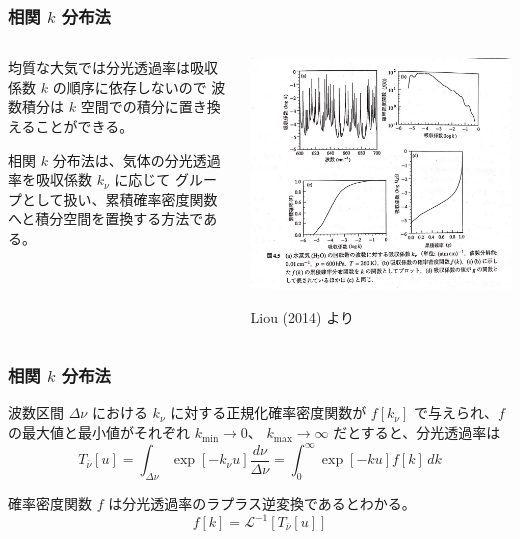 \documentclass[unicode,colorlinks]{beamer}
\newcommand{\centeralign}[1]{\rule{0pt}{0pt}\hfill#1\hfill\rule{0pt}{0pt}}
\begin{document}
\begin{frame}
	\frametitle{相関 $k$ 分布法}
	\begin{columns}
		\begin{column}{0.5\textwidth}
			均質な大気では分光透過率は吸収係数 $k$ の順序に依存しないので
			波数積分は $k$ 空間での積分に置き換えることができる。

			\hfill

			相関 $k$ 分布法は、気体の分光透過率を吸収係数 $k_\nu$ に応じて
			グループとして扱い、累積確率密度関数へと積分空間を置換する方法である。
		\end{column}
		\begin{column}{0.5\textwidth}
			\centeralign{\includegraphics[width=\textwidth]{f.jpg}}
			\centeralign{\tiny Liou (2014) より}
		\end{column}
	\end{columns}
\end{frame}

\begin{frame}
	\frametitle{相関 $k$ 分布法}
	波数区間 $\Delta\nu$ における $k_\nu$ に対する正規化確率密度関数が
	$f[k_\nu]$ で与えられ、$f$ の最大値と最小値がそれぞれ $k_{\mathrm{min}}\to0$、
	$k_{\mathrm{max}}\to\infty$ だとすると、分光透過率は
	\[T_{\bar\nu}[u]=\int_{\Delta\nu}\exp[-k_\nu u]\frac{d\nu}{\Delta\nu}=\int^\infty_0 \exp[-ku]f[k]\,dk\]

	確率密度関数 $f$ は分光透過率のラプラス逆変換であるとわかる。
	\[f[k]=\mathcal{L}^{-1}[T_{\bar\nu}[u]]\]
\end{frame}
\end{document}
